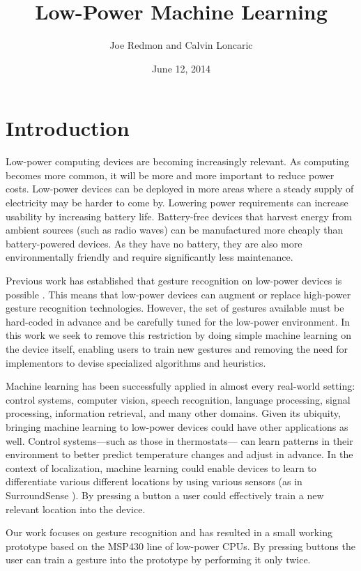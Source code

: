 \documentclass[12pt]{article}
\title{Low-Power Machine Learning}
\author{Joe Redmon and Calvin Loncaric}
\date{June 12, 2014}
\begin{document}
\maketitle

\section{Introduction}

Low-power computing devices are becoming increasingly relevant. As computing
becomes more common, it will be more and more important to reduce power costs.
Low-power devices can be deployed in more areas where a steady supply of
electricity may be harder to come by. Lowering power requirements can increase
usability by increasing battery life. Battery-free devices that harvest energy
from ambient sources (such as radio waves) can be manufactured more cheaply
than battery-powered devices. As they have no battery, they are also more
environmentally friendly and require significantly less maintenance.

Previous work has established that gesture recognition on low-power devices is
possible \cite{allsee}. This means that low-power devices can augment or
replace high-power gesture recognition technologies. However, the set of
gestures available must be hard-coded in advance and be carefully tuned for the
low-power environment. In this work we seek to remove this restriction by doing
simple machine learning on the device itself, enabling users to train new
gestures and removing the need for implementors to devise specialized
algorithms and heuristics.

Machine learning has been successfully applied in almost every real-world
setting: control systems, computer vision, speech recognition, language
processing, signal processing, information retrieval, and many other domains.
Given its ubiquity, bringing machine learning to low-power devices could have
other applications as well. Control systems---such as those in thermostats---%
can learn patterns in their environment to better predict temperature changes
and adjust in advance. In the context of localization, machine learning could
enable devices to learn to differentiate various different locations by using
various sensors (as in SurroundSense \cite{surroundsense}). By pressing a
button a user could effectively train a new relevant location into the device.

Our work focuses on gesture recognition and has resulted in a small working
prototype based on the MSP430 line of low-power CPUs. By pressing buttons the
user can train a gesture into the prototype by performing it only twice.
\end{document}
